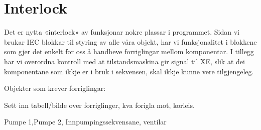 \section{Interlock}
\thispagestyle{fancy}

Det er nytta «interlock» av funksjonar nokre plassar i programmet. 
Sidan vi brukar IEC blokkar til styring av alle våra objekt, har vi funksjonalitet i blokkene som gjer det enkelt for oss å handheve forriglingar mellom komponentar. I tillegg har vi overordna kontroll med at tilstandsmaskina gir signal til XE, slik at dei komponentane som ikkje er i bruk i sekvensen, skal ikkje kunne vere tilgjengeleg.

Objekter som krever forriglingar:

Sett inn tabell/bilde over forriglinger, kva forigla mot, korleis.

Pumpe 1,Pumpe 2, Innpumpingssekvensane, ventilar
